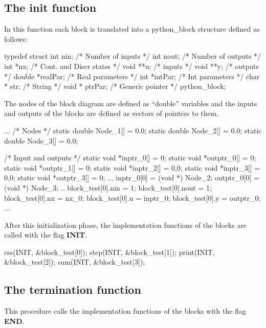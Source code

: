 \subsection{The init function}

In this function each block is translated into a python\_block structure 
defined as follows:

\begin{code}
typedef struct {
  int nin;             /* Number of inputs */
  int nout;            /* Number of outputs */
  int *nx;             /* Cont. and Discr states */
  void **u;            /* inputs */
  void **y;            /* outputs */
  double *realPar;     /* Real parameters */
  int *intPar;         /* Int parameters */
  char * str;          /* String */
  void * ptrPar;       /* Generic pointer */
}python_block;
\end{code}

The nodes of the block diagram are defined as ``double'' variables and the 
inputs and outputs of the blocks are defined as vectors of pointers to them.

\begin{code}
...
/* Nodes */
static double Node_1[] = {0.0};
static double Node_2[] = {0.0};
static double Node_3[] = {0.0};

/* Input and outputs */
static void *inptr_0[]  = {0};
static void *outptr_0[] = {0};
static void *outptr_1[] = {0};
static void *inptr_2[]  = {0,0};
static void *inptr_3[]  = {0,0};
static void *outptr_3[] = {0};
...
  inptr_0[0]  = (void *) Node_2;
  outptr_0[0] = (void *) Node_3;
..
  block_test[0].nin  = 1;
  block_test[0].nout = 1;
  block_test[0].nx   = nx_0;
  block_test[0].u    = inptr_0;
  block_test[0].y    = outptr_0;
...
\end{code}

After this initialization phase, the implementation functions of the blocks are 
called with the 
flag \textbf{INIT}.

\begin{code}
  css(INIT, &block_test[0]);
  step(INIT, &block_test[1]);
  print(INIT, &block_test[2]);
  sum(INIT, &block_test[3]);
\end{code}

\subsection{The termination function}
This procedure calls the implementation functions of the blocks with the flag 
\textbf{END}.

